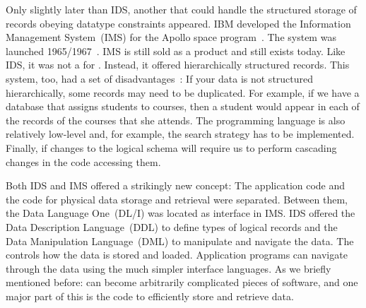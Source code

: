 Only slightly later than IDS, another  that could handle the structured storage of records obeying datatype constraints appeared.
IBM developed the Information Management System~(IMS) for the Apollo space program~\cite{KLBGNLWBS2012ITIYCGTIIMS}.
The system was launched 1965/1967~\cite{BBP2007TBOI}.
IMS is still sold as a product and still exists today.
Like IDS, it was not a  for \emph{}.
Instead, it offered hierarchically structured records.
This system, too, had a set of disadvantages~\cite{KC2024DS}:
If your data is not structured hierarchically, some records may need to be duplicated.
For example, if we have a database that assigns students to courses, then a student would appear in each of the records of the courses that she attends.
The programming language is also relatively low-level and, for example, the search strategy has to be implemented.
Finally, if changes to the logical schema will require us to perform cascading changes in the code accessing them.

Both IDS and IMS offered a strikingly new concept:
The application code and the code for physical data storage and retrieval were separated.
Between them, the Data Language One~(DL/I) was located as interface in IMS.
IDS offered the Data Description Language~(DDL) to define types of logical records and the Data Manipulation Language~(DML) to manipulate and navigate the data.
The  controls how the data is stored and loaded.
Application programs can navigate through the data using the much simpler interface languages.
As we briefly mentioned before:  can become arbitrarily complicated pieces of software, and one major part of this is the code to efficiently store and retrieve data.

